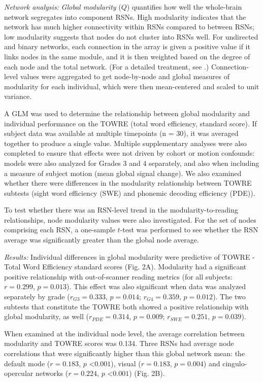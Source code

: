 \emph{Network analysis:} \textit{Global modularity} ($Q$) quantifies how well the whole-brain network segregates into component RSNs. High modularity indicates that the network has much higher connectivity within RSNs compared to between RSNs; low modularity suggests that nodes do not cluster into RSNs well. For undirected and binary networks, each connection in the array is given a positive value if it links nodes in the same module, and it is then weighted based on the degree of each node and the total network. (For a detailed treatment, see \cite{Rubinov2010}.) Connection-level values were aggregated to get node-by-node and global measures of modularity for each individual, which were then mean-centered and scaled to unit variance. 

A GLM was used to determine the relationship between global modularity and individual performance on the TOWRE (total word efficiency, standard score). If subject data was available at multiple timepoints (n = 30), it was averaged together to produce a single value. Multiple supplementary analyses were also completed to ensure that effects were not driven by cohort or motion confounds: models were also analyzed for Grades 3 and 4 separately, and also when including a measure of subject motion (mean global signal change). We also examined whether there were differences in the modularity relationship between TOWRE subtests (sight word efficiency (SWE) and phonemic decoding efficiency (PDE)).

To test whether there was an RSN-level trend in the modularity-to-reading relationships, node modularity values were also investigated. For the set of nodes comprising each RSN, a one-sample $t$-test was performed to see whether the RSN average was significantly greater than the global node average. 

\emph{Results:} Individual differences in global modularity were predictive of TOWRE - Total Word Efficiency standard scores (Fig. 2A). Modularity had a significant positive relationship with out-of-scanner reading metrics (for all subjects: $r = 0.299$, $p = 0.013$). This effect was also significant when data was analyzed separately by grade ($r_{G3} = 0.333$, $p = 0.014$; $r_{G4} = 0.359$, $p = 0.012$). The two subtests that constitute the TOWRE both showed a positive relationship with global modularity, as well ($r_{PDE} = 0.314$, $p = 0.009$; $r_{SWE} = 0.251$, $p = 0.039$). 

When examined at the individual node level, the average correlation between modularity and TOWRE scores was 0.134. Three RSNs had average node correlations that were significantly higher than this global network mean: the default mode ($r = 0.183$, $p$ \textless $0.001$), visual ($r = 0.183$, $p = 0.004$) and cingulo-opercular networks ($r = 0.224$, $p$ \textless $0.001$) (Fig. 2B). 


